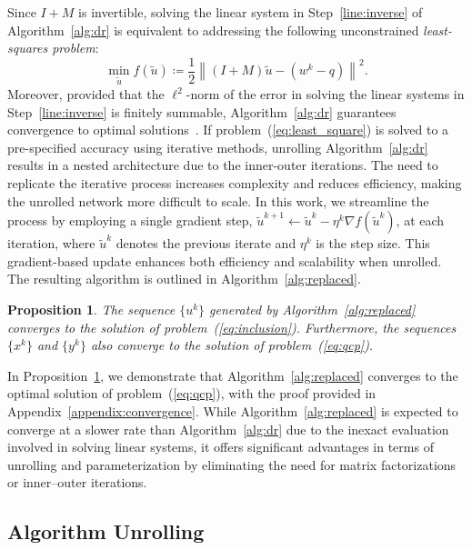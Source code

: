 \documentclass[10pt]{article} %
\newtheorem{proposition}[thm]{Proposition}
\begin{document}
Since $I+M$ is invertible, solving the linear system in Step~\ref{line:inverse} of Algorithm~\ref{alg:dr} is equivalent to addressing the following unconstrained \textit{least-squares problem}: 
\begin{equation}
\label{eq:least_square}
\min_{\tilde{u}} f(\tilde{u}) \coloneqq \frac{1}{2}\left\|(I+M)\tilde{u} - (w^k - q)\right\|^2.
\end{equation}
Moreover, provided that the $\ell^2$-norm of the error in solving the linear systems in Step~\ref{line:inverse} is finitely summable, Algorithm~\ref{alg:dr} guarantees convergence to optimal solutions~\citep{eckstein1992douglas,combettes2004solving}. 
If problem~(\ref{eq:least_square}) is solved to a pre-specified accuracy using iterative methods, unrolling Algorithm~\ref{alg:dr} results in a nested architecture due to the inner-outer iterations. 
The need to replicate the iterative process increases complexity and reduces efficiency, making the unrolled network more difficult to scale. 
In this work, we streamline the process by employing a single gradient step, \( \tilde{u}^{k+1} \gets \tilde{u}^k - \eta^k \nabla f(\tilde{u}^k) \), at each iteration, where \( \tilde{u}^k \) denotes the previous iterate and \( \eta^k \) is the step size. 
This gradient-based update enhances both efficiency and scalability when unrolled. 
The resulting algorithm is outlined in Algorithm~\ref{alg:replaced}.

\begin{proposition} 
\label{prop:convergence} 
The sequence $\{u^k\}$ generated by Algorithm~\ref{alg:replaced} converges to the solution of problem~(\ref{eq:inclusion}). 
Furthermore, the sequences $\{x^k\}$ and $\{y^k\}$ also converge to the solution of problem~(\ref{eq:qcp}). 
\end{proposition}

In Proposition~\ref{prop:convergence}, we demonstrate that Algorithm~\ref{alg:replaced} converges to the optimal solution of problem~(\ref{eq:qcp}), with the proof provided in Appendix~\ref{appendix:convergence}. 
While Algorithm~\ref{alg:replaced} is expected to converge at a slower rate than Algorithm~\ref{alg:dr} due to the inexact evaluation involved in solving linear systems, it offers significant advantages in terms of unrolling and parameterization by eliminating the need for matrix factorizations or inner–outer iterations.

\subsection{Algorithm Unrolling}
\end{document}

